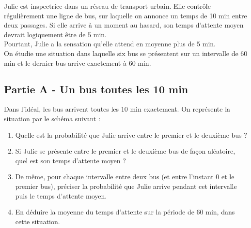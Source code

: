 \documentclass[a4paper,11pt,exos]{nsi} %
\begin{document}
\maketitle

Julie est inspectrice dans un réseau de transport urbain. Elle contrôle régulièrement une ligne de bus, sur laquelle on annonce un temps de 10 min entre deux passages. Si elle arrive à un moment au hasard, son temps d'attente moyen devrait logiquement être de 5 min.\\
Pourtant, Julie a la sensation qu'elle attend en moyenne plus de 5 min.\\[.5em]
On étudie une situation dans laquelle six bus se présentent sur un intervalle de 60 min et le dernier bus arrive exactement à 60 min.

\subsection*{Partie A - Un bus toutes les 10 min}
Dans l'idéal, les bus arrivent toutes les 10 min exactement. On représente la situation par le schéma suivant :
\begin{center}
\end{center}


\begin{enumerate}
    \item Quelle est la probabilité que Julie arrive entre le premier et le deuxième bus ?
    \item Si Julie se présente entre le premier et le deuxième bus de façon aléatoire, quel est son temps d'attente moyen ?
    \item De même, pour chaque intervalle entre deux bus (et entre l'instant 0 et le premier bus), préciser la probabilité que Julie arrive pendant cet intervalle puis le temps d'attente moyen.
    \item En déduire la moyenne du temps d'attente sur la période de 60 min, dans cette situation.
\end{enumerate}
\end{document}

